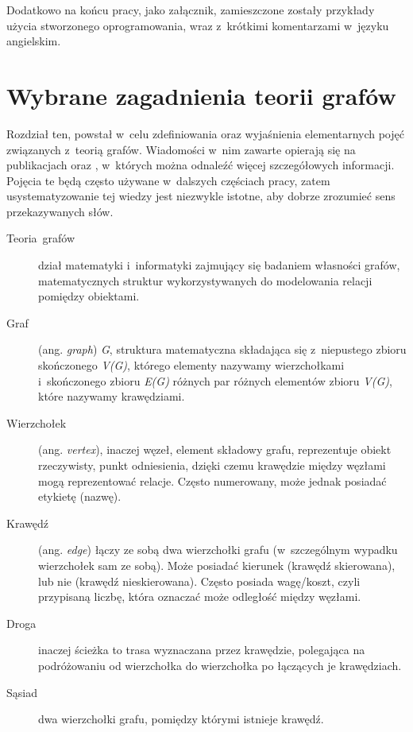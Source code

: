 \documentclass[a4paper,12pt,polish,twoside,openright]{thesis}
\begin{document}
Dodatkowo na końcu pracy, jako załącznik, zamieszczone zostały przykłady użycia stworzonego oprogramowania, wraz z~krótkimi komentarzami w~języku angielskim.

\chapter{Wybrane zagadnienia teorii grafów}
Rozdział ten, powstał w~celu zdefiniowania oraz wyjaśnienia elementarnych pojęć związanych z~teorią grafów. Wiadomości w~nim zawarte opierają się na publikacjach \cite{graphtheory} oraz \cite{graphtheory2}, w~których można odnaleźć więcej szczegółowych informacji.
Pojęcia te będą często używane w~dalszych częściach pracy, zatem usystematyzowanie tej wiedzy jest niezwykle istotne, aby dobrze zrozumieć sens przekazywanych słów.

\begin{description}
	\item[Teoria~grafów] dział matematyki i~informatyki zajmujący się badaniem własności grafów, matematycznych struktur wykorzystywanych do modelowania relacji pomiędzy obiektami.

	\item[Graf] (ang. \emph{graph}) \emph{G}, struktura matematyczna składająca się z~niepustego zbioru skończonego \emph{V(G)}, którego elementy nazywamy wierzchołkami i~skończonego zbioru \emph{E(G)} różnych par różnych elementów zbioru \emph{V(G)}, które nazywamy krawędziami.

	\item[Wierzchołek] (ang. \emph{vertex}), inaczej węzeł, element składowy grafu, reprezentuje obiekt rzeczywisty, punkt odniesienia, dzięki czemu krawędzie między węzłami mogą reprezentować relacje. Często numerowany, może jednak posiadać etykietę (nazwę).

	\item[Krawędź] (ang. \emph{edge}) łączy ze sobą dwa wierzchołki grafu (w~szczególnym wypadku wierzchołek sam ze sobą). Może posiadać kierunek (krawędź skierowana), lub nie (krawędź nieskierowana). Często posiada wagę/koszt, czyli przypisaną liczbę, która oznaczać może odległość między węzłami.

	\item[Droga] inaczej ścieżka to trasa wyznaczana przez krawędzie, polegająca na podróżowaniu od wierzchołka do wierzchołka po łączących je krawędziach.

	\item[Sąsiad] dwa wierzchołki grafu, pomiędzy którymi istnieje krawędź.
\end{description}
\end{document}
